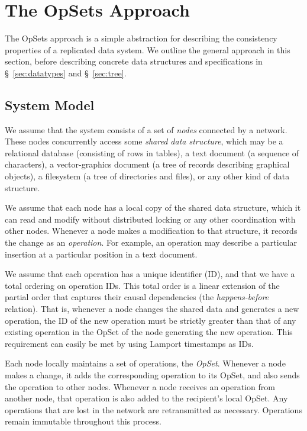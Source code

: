 \section{The OpSets Approach}\label{sec:approach}

The OpSets approach is a simple abstraction for describing the consistency properties of a replicated data system.
We outline the general approach in this section, before describing concrete data structures and specifications in \S~\ref{sec:datatypes} and \S~\ref{sec:tree}.

\subsection{System Model}\label{sec:system-model}

We assume that the system consists of a set of \emph{nodes} connected by a network.
These nodes concurrently access some \emph{shared data structure}, which may be a relational database (consisting of rows in tables), a text document (a sequence of characters), a vector-graphics document (a tree of records describing graphical objects), a filesystem (a tree of directories and files), or any other kind of data structure.

We assume that each node has a local copy of the shared data structure, which it can read and modify without distributed locking or any other coordination with other nodes.
Whenever a node makes a modification to that structure, it records the change as an \emph{operation}.
For example, an operation may describe a particular insertion at a particular position in a text document.

We assume that each operation has a unique identifier (ID), and that we have a total ordering on operation IDs.
This total order is a linear extension of the partial order that captures their causal dependencies (the \emph{happens-before} relation).
That is, whenever a node changes the shared data and generates a new operation, the ID of the new operation must be strictly greater than that of any existing operation in the OpSet of the node generating the new operation.
This requirement can easily be met by using Lamport timestamps \cite{Lamport:1978jq} as IDs.

Each node locally maintains a set of operations, the \emph{OpSet}.
Whenever a node makes a change, it adds the corresponding operation to its OpSet, and also sends the operation to other nodes.
Whenever a node receives an operation from another node, that operation is also added to the recipient's local OpSet.
Any operations that are lost in the network are retransmitted as necessary.
Operations remain immutable throughout this process.

